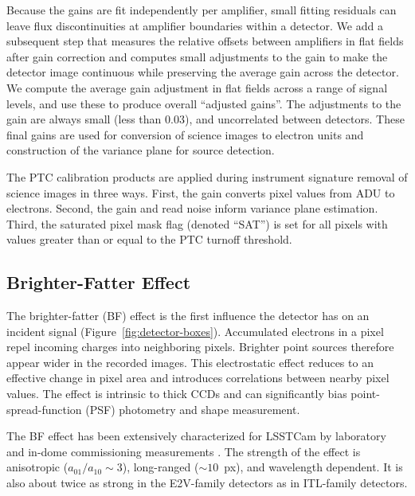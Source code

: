 Because the gains are fit independently per amplifier, small fitting residuals can leave flux discontinuities at amplifier boundaries within a detector.
We add a subsequent step that measures the relative offsets between amplifiers in flat fields after gain correction and computes small adjustments to the gain to make the detector image continuous while preserving the average gain across the detector.
We compute the average gain adjustment in flat fields across a range of signal levels, and use these to produce overall ``adjusted gains''.
The adjustments to the gain are always small (less than 0.03), and uncorrelated between detectors.
These final gains are used for conversion of science images to electron units and construction of the variance plane for source detection.

The PTC calibration products are applied during instrument signature removal of science images in three ways.
First, the gain converts pixel values from ADU to electrons.
Second, the gain and read noise inform variance plane estimation.
Third, the saturated pixel mask flag (denoted ``SAT'') is set for all pixels with values greater than or equal to the PTC turnoff threshold.



\subsection{Brighter-Fatter Effect} \label{sec:processing:calibration:bf}

The brighter-fatter (BF) effect is the first influence the detector has on an incident signal (Figure~\ref{fig:detector-boxes}).
Accumulated electrons in a pixel repel incoming charges into neighboring pixels.
Brighter point sources therefore appear wider in the recorded images.
This electrostatic effect reduces to an effective change in pixel area and introduces correlations between nearby pixel values.
The effect is intrinsic to thick CCDs and can significantly bias point-spread-function (PSF) photometry and shape measurement.

The BF effect has been extensively characterized for LSSTCam by laboratory and in-dome commissioning measurements \citep{broughton2024}.
The strength of the effect is anisotropic ($a_{01}/a_{10} \sim 3$), long-ranged ($\sim 10$~px), and wavelength dependent.
It is also about twice as strong in the E2V-family detectors as in ITL-family detectors.

